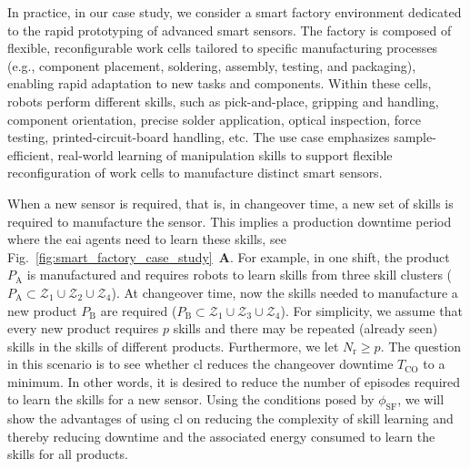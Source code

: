 \documentclass[12pt]{article}
\begin{document}
In practice, in our case study, we consider a smart factory environment dedicated to the rapid prototyping of advanced smart sensors. The factory is composed of flexible, reconfigurable work cells tailored to specific manufacturing processes (e.g., component placement, soldering, assembly, testing, and packaging), enabling rapid adaptation to new tasks and components. Within these cells, robots perform different skills, such as pick-and-place, gripping and handling, component orientation, precise solder application, optical inspection, force testing, printed-circuit-board handling, etc. The use case emphasizes sample-efficient, real-world learning of manipulation skills to support flexible reconfiguration of work cells to manufacture distinct smart sensors.

When a new sensor is required, that is, in changeover time, a new set of skills is required to manufacture the sensor. This implies a production downtime period where the \ac{eai} agents need to learn these skills, see Fig.~\ref{fig:smart_factory_case_study}~\textbf{A}. For example, in one shift, the product $ P_\mathrm{A} $ is manufactured and requires robots to learn skills from three skill clusters ($ P_\text{A}\subset\mathcal{Z}_1
\cup\mathcal{Z}_2\cup\mathcal{Z}_4 $). At changeover time, now the skills needed to manufacture a new product $ P_\mathrm{B} $ are required ($P_\text{B}\subset\mathcal{Z}_1\cup\mathcal{Z}_3\cup\mathcal{Z}_4 $). For simplicity, we assume that every new product requires $ p $ skills and there may be repeated (already seen) skills in the skills of different products. Furthermore, we let $ N_\mathrm{r} \geq p $. The question in this scenario is to see whether \ac{cl} reduces the changeover downtime $ T_\mathrm{CO} $ to a minimum. In other words, it is desired to reduce the number of episodes required to learn the skills for a new sensor. Using the conditions posed by $ \phi_\text{SF}$, we will show the advantages of using \ac{cl} on reducing the complexity of skill learning and thereby reducing downtime and the associated energy consumed to learn the skills for all products.
\end{document}
